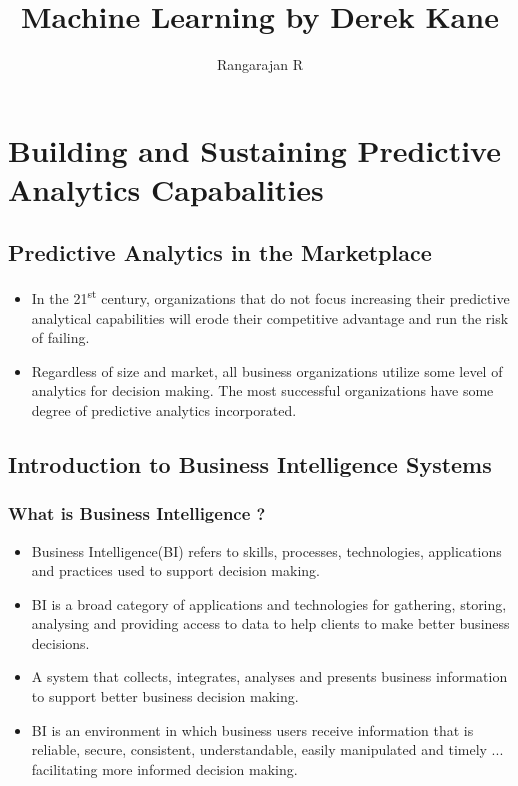 \documentclass{book}
\begin{document}
\title{Machine Learning by Derek Kane}
\author{Rangarajan R}

\tableofcontents
\maketitle

\chapter{Building and Sustaining Predictive Analytics Capabalities}

\section{Predictive Analytics in the Marketplace}
\begin{itemize}
  \item In the 21\textsuperscript{st} century, organizations that do not focus increasing their predictive analytical capabilities will erode their competitive advantage and run the risk of failing.
  \item Regardless of size and market, all business organizations utilize some level of analytics for decision making. The most successful organizations have some degree of predictive analytics incorporated.
\end{itemize}
\section{Introduction to Business Intelligence Systems}

\subsection{What is Business Intelligence ?}
\begin{itemize}
\item Business Intelligence(BI) refers to skills, processes, technologies, applications and practices used to support decision making.
\item BI is a broad category of applications and technologies for gathering, storing, analysing and providing access to data to help clients to make better business decisions.
\item A system that collects, integrates, analyses and presents business information to support better business decision making.
\item BI is an environment in which business users receive information that is reliable, secure, consistent, understandable, easily manipulated and timely ... facilitating more informed decision making.
\end{itemize}
\end{document}
